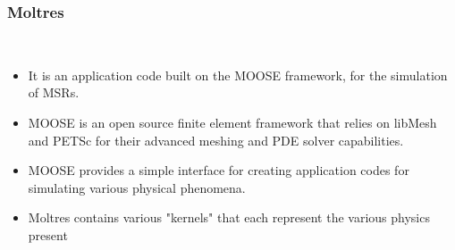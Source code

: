 \begin{frame}
	\frametitle{Moltres}
	\
		\begin{itemize}
			\item It is an application code built on the \gls{MOOSE}
			framework, for the simulation of \glspl{MSR}.
			\item MOOSE is an open source finite element framework that
			relies on libMesh and PETSc for their advanced meshing and PDE
			solver capabilities.
			\item MOOSE provides a simple interface for creating application
			codes for simulating various physical phenomena.
			\item Moltres contains various "kernels" that each represent the
			various physics present 
		\end{itemize}
\end{frame}